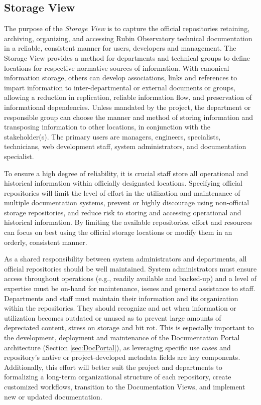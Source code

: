 \subsection{Storage View}
\label{sec:storage-view}

The purpose of the \emph{Storage View} is to capture the official repositories retaining, archiving, organizing, and accessing Rubin Observatory technical documentation in a reliable, consistent manner for users, developers and management.
The Storage View provides a method for departments and technical groups to define locations for respective normative sources of information.
With canonical information storage, others can develop associations, links and references to impart information to inter-departmental or external documents or groups, allowing a reduction in replication, reliable information flow, and preservation of informational dependencies.
Unless mandated by the project, the department or responsible group can choose the manner and method of storing information and transposing information to other locations, in conjunction with the stakeholder(s).
The primary users are managers, engineers, specialists, technicians, web development staff, system administrators, and documentation specialist.

To ensure a high degree of reliability, it is crucial staff store all operational and historical information within officially designated locations.
Specifying official repositories will limit the level of effort in the utilization and maintenance of multiple documentation systems, prevent or highly discourage using non-official storage repositories, and reduce risk to storing and accessing operational and historical information.
By limiting the available repositories, effort and resources can focus on best using the official storage locations or modify them in an orderly, consistent manner.

As a shared responsibility between system administrators and departments, all official repositories should be well maintained.
System administrators must ensure access throughout operations (e.g., readily available and backed-up) and a level of expertise must be on-hand for maintenance, issues and general assistance to staff.
Departments and staff must maintain their information and its organization within the repositories.
They should recognize and act when information or utilization becomes outdated or unused as to prevent large amounts of depreciated content, stress on storage and bit rot.
This is especially important to the development, deployment and maintenance of the Documentation Portal architecture (Section \ref{sec:DocPortal}), as leveraging specific use cases and repository's native or project-developed metadata fields are key components.
Additionally, this effort will better suit the project and departments to formalizing a long-term organizational structure of each repository, create customized workflows, transition to the Documentation Views, and implement new or updated documentation.


